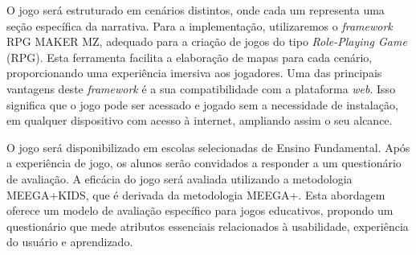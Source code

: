 O jogo será estruturado em cenários distintos, onde cada um representa uma seção específica da narrativa. Para a implementação, utilizaremos o \textit{framework} RPG MAKER MZ, adequado para a criação de jogos do tipo \textit{Role-Playing Game} (RPG). Esta ferramenta facilita a elaboração de mapas para cada cenário, proporcionando uma experiência imersiva aos jogadores. Uma das principais vantagens deste \textit{framework} é a sua compatibilidade com a plataforma \textit{web}. Isso significa que o jogo pode ser acessado e jogado sem a necessidade de instalação, em qualquer dispositivo com acesso à internet, ampliando assim o seu alcance.

O jogo será disponibilizado em escolas selecionadas de Ensino Fundamental. Após a experiência de jogo, os alunos serão convidados a responder a um questionário de avaliação. A eficácia do jogo será avaliada utilizando a metodologia MEEGA+KIDS\cite{GresseVonWangenheim2020}, que é derivada da metodologia MEEGA+\cite{petri2019meega+}. Esta abordagem oferece um modelo de avaliação específico para jogos educativos, propondo um questionário que mede atributos essenciais relacionados à usabilidade, experiência do usuário e aprendizado.